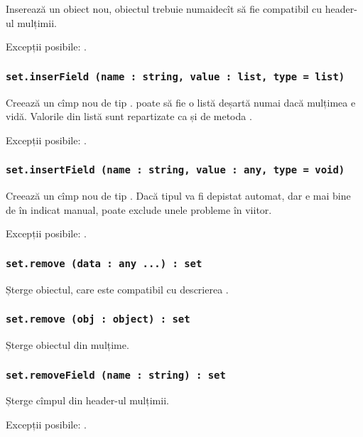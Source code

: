 Inserează un obiect nou, obiectul  trebuie numaidecît să fie compatibil cu header-ul mulțimii.

Excepții posibile: .

\subsubsection{\lstinline|set.inserField (name : string, value : list, type = list)|}

Creează un cîmp nou de tip .  poate să fie o listă deșartă numai dacă mulțimea e vidă. Valorile din listă sunt repartizate ca și de metoda .

Excepții posibile: .

\subsubsection{\lstinline|set.insertField (name : string, value : any, type = void)|}

Creează un cîmp nou de tip . Dacă  tipul va fi depistat automat, dar e mai bine de în indicat manual, poate exclude unele probleme în viitor.

Excepții posibile: .

\subsubsection{\lstinline|set.remove (data : any ...) : set|}

Șterge obiectul, care este compatibil cu descrierea .

\subsubsection{\lstinline|set.remove (obj : object) : set|}

Șterge obiectul  din mulțime.

\subsubsection{\lstinline|set.removeField (name : string) : set|}

Șterge cîmpul  din header-ul mulțimii.

Excepții posibile: .

